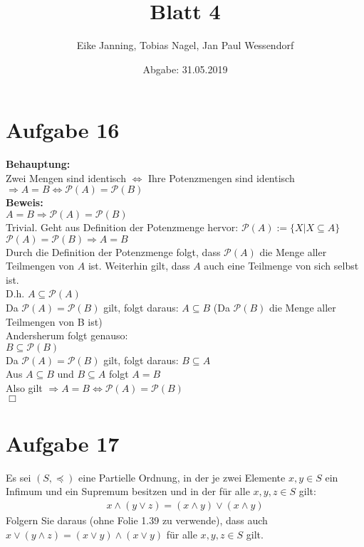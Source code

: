 \documentclass[paper = a4, ngerman]{scrartcl}
\title{Blatt 4}
\author{Eike Janning, Tobias Nagel, Jan Paul Wessendorf}
\date{Abgabe: 31.05.2019}
\begin{document}
	\maketitle
	\hrulefill
	
	\section*{Aufgabe 16}
	
	\textbf{Behauptung:}\\
	Zwei Mengen sind identisch $\Leftrightarrow$ Ihre Potenzmengen sind identisch\\
	
	$\Rightarrow A = B \Leftrightarrow \mathcal{P}(A) = \mathcal{P}(B) $\\
	
	\textbf{Beweis:}\\
	$ A = B \Rightarrow \mathcal{P}(A) = \mathcal{P}(B) $\\
	Trivial. Geht aus Definition der Potenzmenge hervor: $\mathcal{P}(A) := \{ X | X \subseteq A\}$\\
	
	$\mathcal{P}(A) = \mathcal{P}(B) \Rightarrow A = B$\\
	
	Durch die Definition der Potenzmenge folgt, dass $\mathcal{P}(A)$ die Menge aller Teilmengen von $A$ ist. Weiterhin gilt, dass $A$ auch eine Teilmenge von sich selbst ist.\\
	D.h. $A \subseteq \mathcal{P}(A)$\\
	Da $\mathcal{P}(A) = \mathcal{P}(B)$ gilt, folgt daraus: $A \subseteq B$  (Da $\mathcal{P}(B)$ die Menge aller Teilmengen von B ist)\\
	
	Andersherum folgt genauso:\\
	$B \subseteq \mathcal{P}(B)$\\
	Da $\mathcal{P}(A) = \mathcal{P}(B)$ gilt, folgt daraus: $B \subseteq A$\\
	
	Aus $A \subseteq B$ und $B \subseteq A$ folgt $A = B$\\
	
	Also gilt 	$\Rightarrow A = B \Leftrightarrow \mathcal{P}(A) = \mathcal{P}(B) $\\
	
	\hfil$\Box$
	\section*{Aufgabe 17}
	Es sei $(S,\preccurlyeq)$ eine Partielle Ordnung, in der je zwei Elemente $x,y\in S$ ein Infimum und ein Supremum besitzen und in der für alle $x,y,z \in S$ gilt:
	\begin{align}
		x \wedge (y \vee z) = (x \wedge y) \vee (x \wedge y)
	\end{align}
	Folgern Sie daraus (ohne Folie 1.39 zu verwende), dass auch $x \vee (y \wedge z) = (x \vee y) \wedge (x \vee y)$ für alle $x,y,z \in S$ gilt.
	
\end{document}

